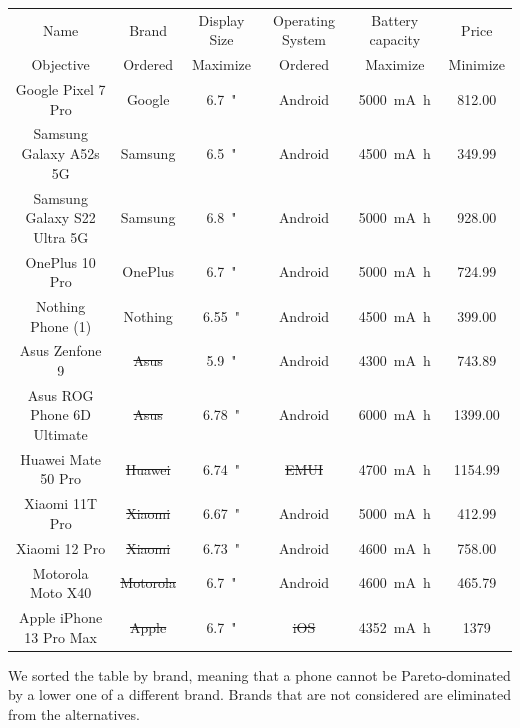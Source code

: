 \documentclass[10pt, UKenglish]{exam}
\newcommand{\price}[1]{\SI[round-precision=2,round-mode=places]{#1}[]{\SIeuro}}
\newcommand{\displaysize}[1]{\qty{#1}{"}}
\newcommand{\capacity}[1]{\qty{#1}{\milli\ampere\hour}}
\begin{document}
\begin{questions}
\begin{solutionorbox}
		{
			\footnotesize
			\begin{tabular}{|c|c|c|c|c|c|}
							\hline
				Name & Brand & Display Size & Operating System & Battery capacity & Price \\%
				\hdashline
				Objective & Ordered & Maximize & Ordered & Maximize & Minimize \\
				\hline\hline
				Google Pixel 7 Pro & Google & \displaysize{6.7} & Android & \capacity{5000} & \price{812.00}\\%
				\hline
				Samsung Galaxy A52s 5G & Samsung & \displaysize{6.5} & Android & \capacity{4500} & \price{349.99}\\%
				\hline
				Samsung Galaxy S22 Ultra 5G & Samsung & \displaysize{6.8} & Android & \capacity{5000} & \price{928.00}\\%
				\hline
				OnePlus 10 Pro & OnePlus & \displaysize{6.7} & Android & \capacity{5000} & \price{724.99}\\%
				\hline
				Nothing Phone (1) & Nothing & \displaysize{6.55} & Android & \capacity{4500} & \price{399.00}\\%
				\hline
				Asus Zenfone 9 & \sout{Asus} & \displaysize{5.9} & Android & \capacity{4300} & \price{743.89}\\%
				\hline
				Asus ROG Phone 6D Ultimate & \sout{Asus} & \displaysize{6.78} & Android & \capacity{6000} & \price{1399.00}\\%
				\hline
				Huawei Mate 50 Pro & \sout{Huawei} & \displaysize{6.74} & \sout{EMUI} & \capacity{4700} & \price{1154.99}\\%
				\hline
				Xiaomi 11T Pro & \sout{Xiaomi} & \displaysize{6.67} & Android & \capacity{5000} & \price{412.99}\\%
				\hline
				Xiaomi 12 Pro & \sout{Xiaomi} & \displaysize{6.73} & Android & \capacity{4600} & \price{758.00}\\%
				\hline
				Motorola Moto X40 & \sout{Motorola} & \displaysize{6.7} & Android & \capacity{4600} & \price{465.79}\\%
				\hline
				Apple iPhone 13 Pro Max & \sout{Apple} & \displaysize{6.7} & \sout{iOS} & \capacity{4352} & \price{1379}\\%
				\hline
			\end{tabular}
		}

		We sorted the table by brand, meaning that a phone cannot be
		Pareto-dominated by a lower one of a different brand. Brands
		that are not considered are eliminated from the alternatives.


\end{solutionorbox}
\end{questions}
\end{document}
